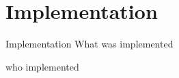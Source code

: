 \section{Implementation}
\begin{frame}{Implementation}
	What was implemented
	
	who implemented
\end{frame}